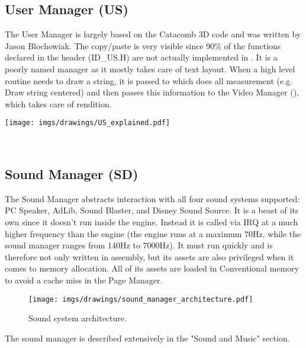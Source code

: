 \documentclass[book.tex]{subfiles}
\begin{document}
\subsection{User Manager (US)}
\begin{minipage}{0.7\textwidth}
The User Manager is largely based on the Catacomb 3D code and was written by Jason Blochowiak. The copy/paste is very visible since 90\% of the functions declared in the header (ID\_US.H) are not actually implemented in . 
It is a poorly named manager as it mostly takes care of text layout. When a  high level routine needs to draw a string, it is passed to  which does all measurement (e.g. Draw string centered)
and then passes this information to the Video Manager (), which takes care of rendition.
\end{minipage}
\begin{minipage}{0.3\textwidth}
\begin{flushright}
\texttt{[image: imgs/drawings/US\_explained.pdf]}
\end{flushright}
\end{minipage}
\noindent
\\












\subsection{Sound Manager (SD)}
The Sound Manager abstracts interaction with all four sound systems supported: PC Speaker, AdLib, Sound Blaster, and Disney Sound Source. It is a beast of its own since it doesn't run inside the engine. Instead it is called via IRQ at a much higher frequency than the engine (the engine runs at a maximum 70Hz, while the sound manager ranges from 140Hz to 7000Hz). It must run quickly and is therefore not only written in assembly, but its assets are also privileged when it comes to memory allocation. All of its assets are loaded in Conventional memory to avoid a cache miss in the Page Manager.\\
 \par
\begin{figure}[H]
\centering
 \texttt{[image: imgs/drawings/sound\_manager\_architecture.pdf]}
 \caption{Sound system architecture.}
 \end{figure}
 \par
The sound manager is described extensively in the "Sound and Music" section.
\end{document}

